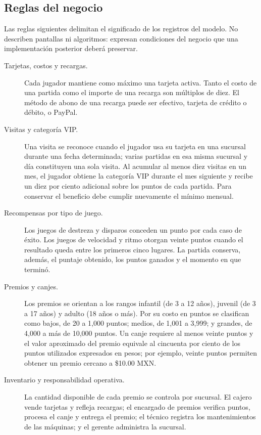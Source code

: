 \subsection{Reglas del negocio}

\begin{resumencaso}
Las reglas siguientes delimitan el significado de los registros del modelo.
No describen pantallas ni algoritmos: expresan condiciones del negocio que una
implementación posterior deberá preservar.
\end{resumencaso}

\begin{description}
  \item[Tarjetas, costos y recargas.]
  Cada jugador mantiene como máximo una tarjeta activa. Tanto el costo de una
  partida como el importe de una recarga son múltiplos de diez. El método de
  abono de una recarga puede ser efectivo, tarjeta de crédito o débito, o
  PayPal.

  \item[Visitas y categoría VIP.]
  Una visita se reconoce cuando el jugador usa su tarjeta en una sucursal
  durante una fecha determinada; varias partidas en esa misma sucursal y día
  constituyen una sola visita. Al acumular al menos diez visitas en un mes, el
  jugador obtiene la categoría VIP durante el mes siguiente y recibe un
  diez por ciento adicional sobre los puntos de cada partida. Para conservar
  el beneficio debe cumplir nuevamente el mínimo mensual.

  \item[Recompensas por tipo de juego.]
  Los juegos de destreza y disparos conceden un punto por cada caso de éxito.
  Los juegos de velocidad y ritmo otorgan veinte puntos cuando el resultado
  queda entre los primeros cinco lugares. La partida conserva, además, el
  puntaje obtenido, los puntos ganados y el momento en que terminó.

  \item[Premios y canjes.]
  Los premios se orientan a los rangos infantil (de 3 a 12 años), juvenil (de
  3 a 17 años) y adulto (18 años o más). Por su costo en puntos se clasifican
  como bajos, de 20 a 1,000 puntos; medios, de 1,001 a 3,999; y grandes, de
  4,000 a más de 10,000 puntos. Un canje requiere al menos veinte puntos y el
  valor aproximado del premio equivale al cincuenta por ciento de los puntos
  utilizados expresados en pesos; por ejemplo, veinte puntos permiten obtener
  un premio cercano a \$10.00 MXN.

  \item[Inventario y responsabilidad operativa.]
  La cantidad disponible de cada premio se controla por sucursal. El cajero
  vende tarjetas y refleja recargas; el encargado de premios verifica puntos,
  procesa el canje y entrega el premio; el técnico registra los mantenimientos
  de las máquinas; y el gerente administra la sucursal.
\end{description}

